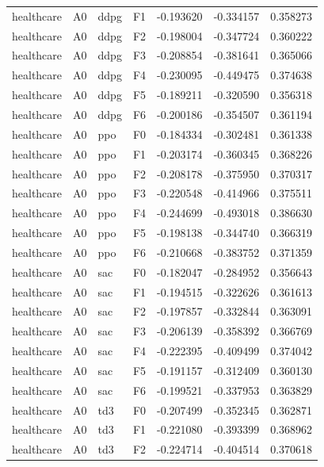 \begin{tabular}{llllrrr}
healthcare &      A0 &      ddpg &  F1 & -0.193620 & -0.334157 &  0.358273 \\
healthcare &      A0 &      ddpg &  F2 & -0.198004 & -0.347724 &  0.360222 \\
healthcare &      A0 &      ddpg &  F3 & -0.208854 & -0.381641 &  0.365066 \\
healthcare &      A0 &      ddpg &  F4 & -0.230095 & -0.449475 &  0.374638 \\
healthcare &      A0 &      ddpg &  F5 & -0.189211 & -0.320590 &  0.356318 \\
healthcare &      A0 &      ddpg &  F6 & -0.200186 & -0.354507 &  0.361194 \\
healthcare &      A0 &       ppo &  F0 & -0.184334 & -0.302481 &  0.361338 \\
healthcare &      A0 &       ppo &  F1 & -0.203174 & -0.360345 &  0.368226 \\
healthcare &      A0 &       ppo &  F2 & -0.208178 & -0.375950 &  0.370317 \\
healthcare &      A0 &       ppo &  F3 & -0.220548 & -0.414966 &  0.375511 \\
healthcare &      A0 &       ppo &  F4 & -0.244699 & -0.493018 &  0.386630 \\
healthcare &      A0 &       ppo &  F5 & -0.198138 & -0.344740 &  0.366319 \\
healthcare &      A0 &       ppo &  F6 & -0.210668 & -0.383752 &  0.371359 \\
healthcare &      A0 &       sac &  F0 & -0.182047 & -0.284952 &  0.356643 \\
healthcare &      A0 &       sac &  F1 & -0.194515 & -0.322626 &  0.361613 \\
healthcare &      A0 &       sac &  F2 & -0.197857 & -0.332844 &  0.363091 \\
healthcare &      A0 &       sac &  F3 & -0.206139 & -0.358392 &  0.366769 \\
healthcare &      A0 &       sac &  F4 & -0.222395 & -0.409499 &  0.374042 \\
healthcare &      A0 &       sac &  F5 & -0.191157 & -0.312409 &  0.360130 \\
healthcare &      A0 &       sac &  F6 & -0.199521 & -0.337953 &  0.363829 \\
healthcare &      A0 &       td3 &  F0 & -0.207499 & -0.352345 &  0.362871 \\
healthcare &      A0 &       td3 &  F1 & -0.221080 & -0.393399 &  0.368962 \\
healthcare &      A0 &       td3 &  F2 & -0.224714 & -0.404514 &  0.370618 \\

\end{tabular}
